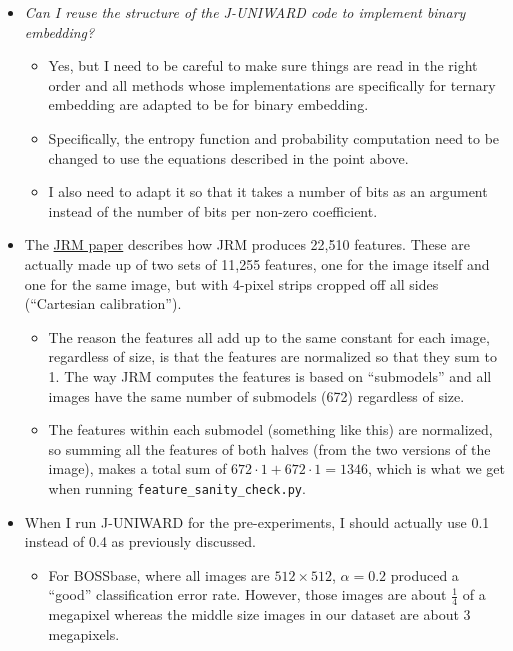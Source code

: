 \documentclass[11pt,a4paper]{report}
\begin{document}
\begin{itemize}
\item \textit{Can I reuse the structure of the J-UNIWARD code to implement binary embedding?}
  \begin{itemize}
  \item Yes, but I need to be careful to make sure things are read in the right order and all methods whose implementations are specifically for ternary embedding are adapted to be for binary embedding.
  \item Specifically, the entropy function and probability computation need to be changed to use the equations described in the point above.
  \item I also need to adapt it so that it takes a number of bits as an argument instead of the number of bits per non-zero coefficient.
  \end{itemize}

\item The \href{http://dde.binghamton.edu/kodovsky/pdf/SPIE2012_Kodovsky_Steganalysis_of_JPEG_Images_Using_Rich_Models_paper.pdf}{JRM paper} describes how JRM produces 22,510 features. These are actually made up of two sets of 11,255 features, one for the image itself and one for the same image, but with 4-pixel strips cropped off all sides (``Cartesian calibration'').
  \begin{itemize}
  \item The reason the features all add up to the same constant for each image, regardless of size, is that the features are normalized so that they sum to 1. The way JRM computes the features is based on ``submodels'' and all images have the same number of submodels (672) regardless of size.
  \item The features within each submodel (something like this) are normalized, so summing all the features of both halves (from the two versions of the image), makes a total sum of $672\cdot1 + 672\cdot1 = 1346$, which is what we get when running \texttt{feature\_sanity\_check.py}.
  \end{itemize}

\item When I run J-UNIWARD for the pre-experiments, I should actually use 0.1 instead of 0.4 as previously discussed.
  \begin{itemize}
  \item For BOSSbase, where all images are $512 \times 512$, $\alpha = 0.2$ produced a ``good'' classification error rate. However, those images are about $\frac{1}{4}$ of a megapixel whereas the middle size images in our dataset are about $3$ megapixels.
  \end{itemize}


\end{itemize}
\end{document}
